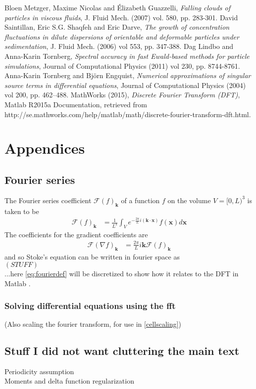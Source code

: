 \documentclass[a4paper,twoside=false,abstract=false,numbers=noenddot,
titlepage=false,headings=small,parskip=half,version=last]{scrartcl}
\begin{document}
\begin{thebibliography}{1}
		Bloen Metzger, Maxime Nicolas and Élizabeth Guazzelli,
		{\em Falling clouds of particles in viscous fluids},
		J. Fluid Mech. (2007) vol. 580, pp. 283-301.
        David Saintillan, Eric S.G. Shaqfeh and Eric Darve,
        {\em The growth of concentration fluctuations in dilute dispersions of orientable and deformable particles under sedimentation},
        J. Fluid Mech. (2006) vol 553, pp. 347-388.
        Dag Lindbo and Anna-Karin Tornberg,
        {\em Spectral accuracy in fast Ewald-based methods for particle simulations},
        Journal of Computational Physics (2011) vol 230, pp. 8744-8761.
        Anna-Karin Tornberg and Björn Engquist,
        {\em Numerical approximations of singular source terms
in differential equations},
        Journal of Computational Physics (2004) vol 200, pp. 462–488.
        MathWorks (2015),
        {\em Discrete Fourier Transform (DFT)},
        Matlab R2015a Documentation, retrieved from http://se.mathworks.com/help/matlab/math/discrete-fourier-transform-dft.html.
	
\end{thebibliography}

\section{Appendices}
\subsection{Fourier series}
The Fourier series coefficient $\mathcal{F}(f)_{\mathbf{k}}$ of a function $f$ on the volume $V=[0,L)^3$ is taken to be
\begin{align}
\mathcal{F}(f)_{\mathbf{k}} &= \frac{1}{L^3} \int_V e^{-\frac{2\pi}{L}i(\mathbf{k}\cdot \mathbf{x})}f(\mathbf{x})d\mathbf{x}
    \label{eq:fourierdef}
\end{align}
The coefficients for the gradient coefficients are
\begin{align}
\mathcal{F}(\nabla f)_{\mathbf{k}} &= \frac{2\pi}{L}i\mathbf{k} \mathcal{F}(f)_{\mathbf{k}}
\end{align}
and so Stoke's equation can be written in fourier space as \\
$\left(STUFF\right)$\\
...here \eqref{eq:fourierdef} will be discretized to show how it relates to the DFT in Matlab \cite{matlabdft}.

\subsubsection{Solving differential equations using the fft}
(Also scaling the fourier transform, for use in \ref{cellscaling})
\subsection{Stuff I did not want cluttering the main text}
Periodicity assumption\\
Moments and delta function regularization
\end{document}
